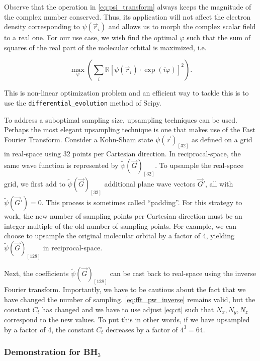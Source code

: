 Observe that the operation in \cref{eq:psi_transform} always keeps the magnitude of the complex number conserved. Thus, its application will not affect the electron density corresponding to $\psi(\vec{r}_{i})$ and allows us to morph the complex scalar field to a real one. For our use case, we wish find the optimal $\varphi$ such that the sum of squares of the real part of the molecular orbital is maximized, i.e.

\begin{equation}
    \max_\varphi \left(\sum_{i}\mathbb{R}\left[ \psi(\vec{r}_{i}) \cdot \exp \left(i \varphi \right)\right]^{2} \right).
    \label{eq:optimize_real}
\end{equation}

This is non-linear optimization problem and an efficient way to tackle this is to use the \texttt{differential\_evolution} method of Scipy.\cite{differential_evolution}

To address a suboptimal sampling size, upsampling techniques can be used. Perhaps the most elegant upsampling technique is one that makes use of the Fast Fourier Transform. Consider a Kohn-Sham state $\psi(\vec{r})_{[32]}$ as defined on a grid in real-space using 32 points per Cartesian direction. In reciprocal-space, the same wave function is represented by $\tilde{\psi}(\vec{G})_{[32]}$. To upsample the real-space grid, we first add to $\tilde{\psi}(\vec{G})_{[32]}$ additional plane wave vectors $\vec{G}\prime$, all with $\tilde{\psi}(\vec{G}\prime) = 0$. This process is sometimes called ``padding''. For this strategy to work, the new number of sampling points per Cartesian direction must be an integer multiple of the old number of sampling points. For example, we can choose to upsample the original molecular orbital by a factor of 4, yielding $\tilde{\psi}(\vec{G})_{[128]}$ in reciprocal-space.

Next, the coefficients $\tilde{\psi}(\vec{G})_{[128]}$ can be cast back to real-space using the inverse Fourier transform. Importantly, we have to be cautious about the fact that we have changed the number of sampling. \cref{eq:fft_pw_inverse} remains valid, but the constant $C_{t}$ has changed and we have to use adjust \cref{eq:ct} such that $N_{x},N_{y},N_{z}$ correspond to the new values. To put this in other words, if we have upsampled by a factor of 4, the constant $C_{t}$ decreases by a factor of $4^{3}=64$.

%
%
%
\subsubsection{Demonstration for BH$_{3}$}

